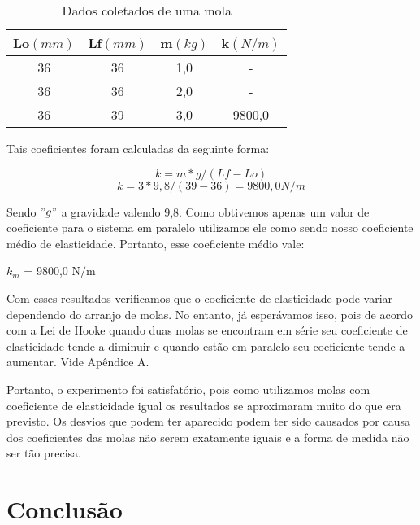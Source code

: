 \documentclass[
	12pt,				%
	oneside,			%
	a4paper,			%
	english,			%
	french,				%
	spanish,			%
	brazil,				%
	]{abntex2}
\begin{document}
\begin{center}
\begin{table}[H]
\caption{Dados coletados de uma mola}
\begin{center}
\begin{tabular}{c|c|c|c}

\hline
Lo$(mm)$ & Lf$(mm)$ & m$(kg)$ & k$(N/m)$ \\ 
\hline
36 & 36 & 1,0 & - \\
\hline
36 & 36 & 2,0 & - \\
\hline
36 & 39 & 3,0 & 9800,0 \\


\end{tabular}
\end{center}
\end{table}
\end{center}

Tais coeficientes foram calculadas da seguinte forma:

\[
k = m*g/(Lf - Lo)
\]
\[
k = 3*9,8/(39 - 36) = 9800,0 N/m
\]

Sendo $"g"$ a gravidade valendo 9,8. Como obtivemos apenas um valor de coeficiente para o sistema em paralelo utilizamos ele como sendo nosso coeficiente médio de elasticidade. Portanto, esse coeficiente médio vale:

\begin{center}
$k_{m}$ = 9800,0 N$/$m
\end{center}

Com esses resultados verificamos que o coeficiente de elasticidade pode variar dependendo do arranjo de molas. No entanto, já esperávamos isso, pois de acordo com a Lei de Hooke quando duas molas se encontram em série seu coeficiente de elasticidade tende a diminuir e quando estão em paralelo seu coeficiente tende a aumentar. Vide Apêndice A.

Portanto, o experimento foi satisfatório, pois como utilizamos molas com coeficiente de elasticidade igual os resultados se aproximaram muito do que era previsto. Os desvios que podem ter aparecido podem ter sido causados por causa dos coeficientes das molas não serem exatamente iguais e a forma de medida não ser tão precisa.

\newpage

\section[Conclusão]{Conclusão}
\pagestyle{fancy}%
\end{document}
